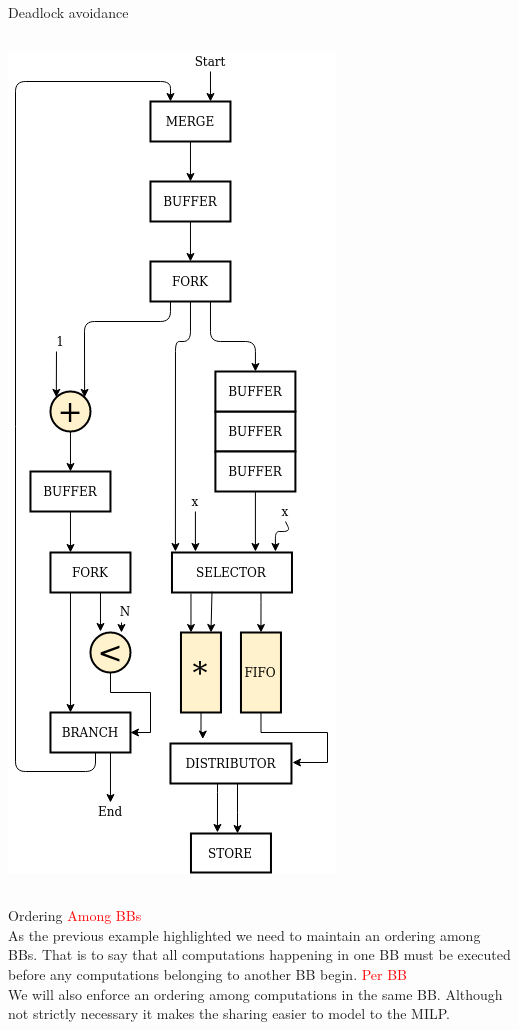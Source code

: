 \documentclass{beamer}
\renewcommand{\emph}{\textcolor{red}}
\begin{document}
\begin{frame}{Deadlock avoidance}
\begin{columns}[T]
\begin{column}{0.25\textwidth}
      \includegraphics[scale=0.25]{blocking_shared.png}
    \end{column}
  \end{columns}
\end{frame}
\begin{frame}{Ordering}
\emph{Among BBs} \\
As the previous example highlighted we need to maintain an ordering among BBs. That is to say that all computations happening in one BB must be executed before any computations belonging to another BB begin. \newline \newline
\emph{Per BB} \\
We will also enforce an ordering among computations in the same BB. Although not strictly necessary it makes the sharing easier to model to the MILP.
\end{frame}
\end{document}
